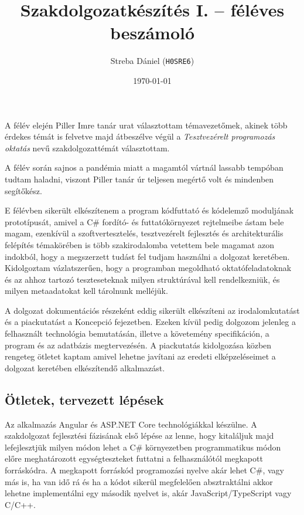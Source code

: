 \documentclass[a4paper,12pt]{article}
\title{\textbf{Szakdolgozatkészítés I. -- féléves beszámoló}}
\author{Streba Dániel (\texttt{H0SRE6})}
\date{\today}
\begin{document}
    \maketitle

    A félév elején Piller Imre tanár urat választottam témavezetőmek, akinek több érdekes témát is felvetve majd átbeszélve végül a \emph{Tesztvezérelt programozás oktatás} nevű szakdolgozattémát választottam. 
    
    A félév során sajnos a pandémia miatt a magamtól vártnál lassabb tempóban tudtam haladni, viszont Piller tanár úr teljesen megértő volt és mindenben segítőkész.

    E félévben sikerült elkészítenem a program kódfuttató és kódelemző moduljának prototípusát, amivel a C\# fordító- és futtatókörnyezet rejtelmeibe ástam bele magam, ezenkívül a szoftvertesztelés, tesztvezérelt fejlesztés és architekturális felépítés témakörében is több szakirodalomba vetettem bele magamat azon indokból, hogy a megszerzett tudást fel tudjam használni a dolgozat keretében. Kidolgoztam vázlatszerűen, hogy a programban megoldható oktatófeladatoknak és az ahhoz tartozó teszteseteknak milyen struktúrával kell rendelkezniük, és milyen metaadatokat kell tárolnunk melléjük.

    A dolgozat dokumentációs részeként eddig sikerült elkészíteni az irodalomkutatást és a piackutatást a Koncepció fejezetben. Ezeken kívül pedig dolgozom jelenleg a felhasznált technológia bemutatásán, illetve a követemény specifikáción, a program és az adatbázis megtervezésén. A piackutatás kidolgozása közben rengeteg ötletet kaptam amivel lehetne javítani az eredeti elképzeléseimet a dolgozat keretében elkészítendő alkalmazást.
    
    \subsection*{Ötletek, tervezett lépések}

    Az alkalmazás Angular és ASP.NET Core technológiákkal készülne. A szakdolgozat fejlesztési fázisának első lépése az lenne, hogy kitaláljuk majd lefejlesztjük milyen módon lehet a C\# környezetben programmatikus módon előre meghatározott egységteszteket futtatni a felhasználótól megkapott forráskódra. A megkapott forráskód programozási nyelve akár lehet C\#, vagy más is, ha van idő rá és ha a kódot sikerül megfelelően absztraktálni akkor lehetne implementálni egy második nyelvet is, akár JavaScript/TypeScript vagy C/C++.
\end{document}
